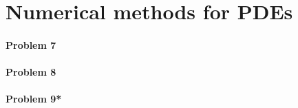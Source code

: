 \section*{Numerical methods for PDEs}
\paragraph{Problem 7}
\paragraph{Problem 8}
\paragraph{Problem 9*}



